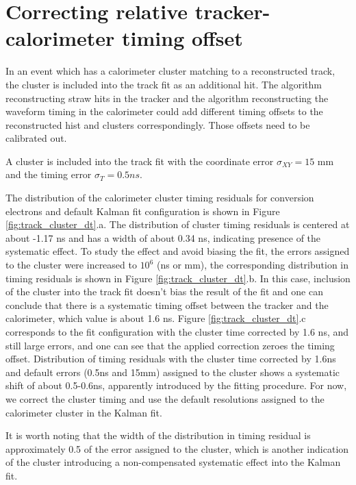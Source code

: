 \section{Correcting relative tracker-calorimeter timing offset}

In an event which has a calorimeter cluster matching to a reconstructed track, the
cluster is included into the track fit as an additional hit. The algorithm reconstructing 
straw hits in the tracker and the algorithm reconstructing the waveform timing in the calorimeter
could add different timing offsets to the reconstructed hist and clusters correspondingly.
Those offsets need to be calibrated out.

A cluster is included into the track fit with the coordinate error $\sigma_{XY} = 15$ mm
and the timing error $\sigma_T = 0.5ns$.

The distribution of the calorimeter cluster timing residuals for conversion electrons and default Kalman fit 
configuration is shown in Figure \ref{fig:track_cluster_dt}.a. The distribution of cluster timing residuals 
is centered at about -1.17 ns and has a width of about 0.34 ns, indicating presence of the systematic effect.
To study the effect and avoid biasing the fit, the errors assigned to the cluster were increased to $10^6$ (ns or mm),
the corresponding distribution in timing residuals is shown in Figure \ref{fig:track_cluster_dt}.b. 
In this case, inclusion of the cluster into the track fit doesn't bias the result of the fit and one can conclude 
that there is a systematic timing offset between the tracker and the calorimeter, which value is about 1.6 ns.
Figure \ref{fig:track_cluster_dt}.c corresponds to the fit configuration with the cluster time corrected by 1.6 ns, 
and still large errors, and one can see that the applied correction zeroes the timing offset.
Distribution of timing residuals with the cluster time corrected by 1.6ns and default errors (0.5ns and 15mm) 
assigned to the cluster shows a systematic shift of about 0.5-0.6ns, apparently introduced by the fitting procedure.
For now, we correct the cluster timing and use the default resolutions assigned to the calorimeter cluster 
in the Kalman fit.

It is worth noting that the width of the distribution in timing residual is approximately 0.5 of the error assigned 
to the cluster, which is another indication of the cluster introducing a non-compensated systematic effect into the 
Kalman fit.

